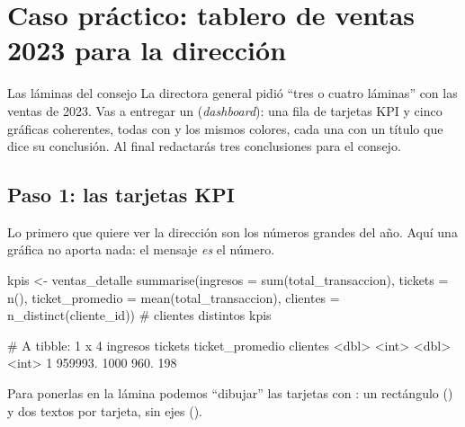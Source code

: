 \section{Caso práctico: tablero de ventas 2023 para la dirección}
\label{sec:m3-caso}

\begin{ejemplo}{Las láminas del consejo}
La directora general pidió ``tres o cuatro láminas'' con las ventas de 2023.
Vas a entregar un  (\emph{dashboard}): una fila de
tarjetas KPI y cinco gráficas coherentes, todas con
 y los mismos colores, cada una con un título que
dice su conclusión. Al final redactarás tres conclusiones para el consejo.
\end{ejemplo}

\subsection{Paso 1: las tarjetas KPI}

Lo primero que quiere ver la dirección son los números grandes del año.
Aquí una gráfica no aporta nada: el mensaje \emph{es} el número.

\begin{rcode}
kpis <- ventas_detalle %
  summarise(ingresos = sum(total_transaccion),
            tickets  = n(),
            ticket_promedio = mean(total_transaccion),
            clientes = n_distinct(cliente_id))   # clientes distintos
kpis
\end{rcode}
\begin{rsalida}
# A tibble: 1 x 4
  ingresos tickets ticket_promedio clientes
     <dbl>   <int>           <dbl>    <int>
1  959993.    1000            960.      198
\end{rsalida}

Para ponerlas en la lámina podemos ``dibujar'' las tarjetas con
: un rectángulo () y dos textos por
tarjeta, sin ejes ().


